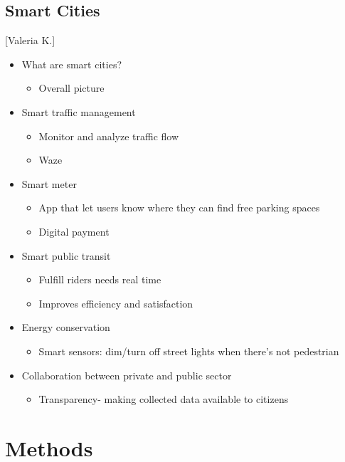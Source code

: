 \documentclass[12pt]{article}                         %
\begin{document}
\subsection{Smart Cities}[Valeria K.]
\begin{itemize}

\item What are smart cities?
    \begin{itemize}
        \item Overall picture
    \end{itemize}
\item Smart traffic management
    \begin{itemize}
        \item Monitor and analyze traffic flow
        \item Waze
    \end{itemize}
\item Smart meter
    \begin{itemize}
        \item App that let users know where they can find free parking spaces
        \item Digital payment
     \end{itemize}
\item Smart public transit
    \begin{itemize}
        \item Fulfill riders needs real time
    \end{itemize}
        \begin{itemize}
            \item Improves efficiency and satisfaction
        \end{itemize}
\item Energy conservation
    \begin{itemize}
        \item Smart sensors: dim/turn off street lights when there's not pedestrian
           \end{itemize}
\item Collaboration between private and public sector
     \begin{itemize}
         \item Transparency- making collected data available to citizens
     \end{itemize}
\end{itemize}



\newpage
\section{Methods}


\newpage


\end{document}
